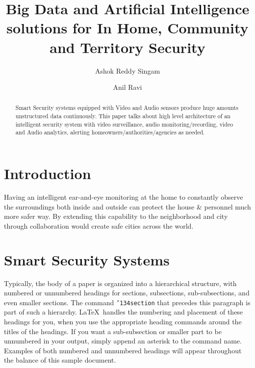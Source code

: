 \documentclass[sigconf]{acmart}
\begin{document}
\title{Big Data and Artificial Intelligence solutions for In Home, Community and Territory Security}


\author{Ashok Reddy Singam}

\author{Anil Ravi}

\begin{abstract}
Smart Security systems equipped with Video and Audio sensors produce huge amounts unstructured data continuously. 
This paper talks about high level architecture of an intelligent security system with video surveillance,  audio monitoring/recording, video and Audio analytics, alerting homeowners/authorities/agencies as needed.

\end{abstract}



\maketitle

\section{Introduction}

Having an intelligent ear-and-eye monitoring at the home to constantly observe the surroundings both inside and outside can protect the house & personnel much more safer way. By extending this capability to the neighborhood and city through collaboration would create safe cities across the world. 

\section{Smart Security Systems}

Typically, the body of a paper is organized into a hierarchical
structure, with numbered or unnumbered headings for sections,
subsections, sub-subsections, and even smaller sections.  The command
\texttt{{\char'134}section} that precedes this paragraph is part of
such a hierarchy. \LaTeX\ handles the
numbering and placement of these headings for you, when you use the
appropriate heading commands around the titles of the headings.  If
you want a sub-subsection or smaller part to be unnumbered in your
output, simply append an asterisk to the command name.  Examples of
both numbered and unnumbered headings will appear throughout the
balance of this sample document.
\end{document}
